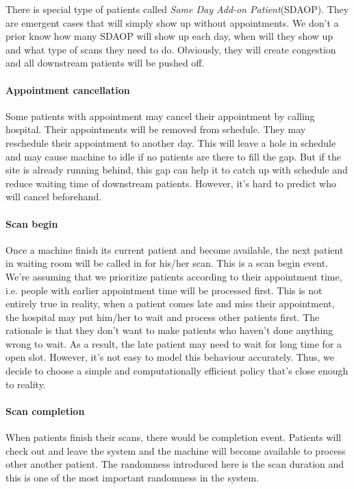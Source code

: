 There is special type of patients called \textit{Same Day Add-on Patient}(SDAOP). They are emergent cases that will simply show up without appointments. We don't a prior know how many SDAOP will show up each day, when will they show up and what type of scans they need to do. Obviously, they will create congestion and all downstream patients will be pushed off.

\paragraph{Appointment cancellation}

Some patients with appointment may cancel their appointment by calling hospital. Their appointments will be removed from schedule. They may reschedule their appointment to another day. This will leave a hole in schedule and may cause machine to idle if no patients are there to fill the gap. But if the site is already running behind, this gap can help it to catch up with schedule and reduce waiting time of downstream patients. However, it's hard to predict who will cancel beforehand.

\paragraph{Scan begin}

Once a machine finish its current patient and become available, the next patient in waiting room will be called in for his/her scan. This is a scan begin event. We're assuming that we prioritize patients according to their appointment time, i.e. people with earlier appointment time will be processed first. This is not entirely true in reality, when a patient comes late and miss their appointment, the hospital may put him/her to wait and process other patients first. The rationale is that they don't want to make patients who haven't done anything wrong to wait. As a result, the late patient may need to wait for long time for a open slot. However, it's not easy to model this behaviour accurately. Thus, we decide to choose a simple and computationally efficient policy that's close enough to reality.

\paragraph{Scan completion} When patients finish their scans, there would be completion event. Patients will check out and leave the system and the machine will become available to process other another patient. The randomness introduced here is the scan duration and this is one of the most important randomness in the system.

